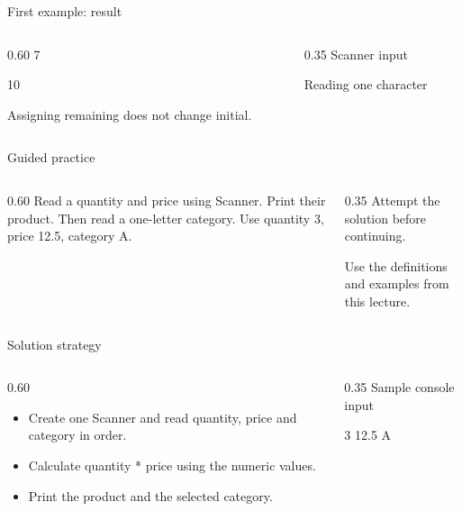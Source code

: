 \documentclass[10pt,aspectratio=169]{beamer}
\begin{document}
\begin{frame}[fragile,t]{First example: result}
\begin{columns}[T,onlytextwidth]\begin{column}{0.60\textwidth}
7\par 10\par Assigning remaining does not change initial.
\end{column}\begin{column}{0.35\textwidth}\small
Scanner input

Reading one character
\end{column}\end{columns}
\end{frame}

\begin{frame}[fragile,t]{Guided practice}
\begin{columns}[T,onlytextwidth]\begin{column}{0.60\textwidth}
Read a quantity and price using Scanner. Print their product. Then read a one-letter category. Use quantity 3, price 12.5, category A.
\end{column}\begin{column}{0.35\textwidth}\small
Attempt the solution before continuing.

Use the definitions and examples from this lecture.
\end{column}\end{columns}
\end{frame}

\begin{frame}[fragile,t]{Solution strategy}
\begin{columns}[T,onlytextwidth]\begin{column}{0.60\textwidth}
\begin{itemize}
\item Create one Scanner and read quantity, price and category in order.
\item Calculate quantity * price using the numeric values.
\item Print the product and the selected category.
\end{itemize}
\end{column}\begin{column}{0.35\textwidth}\small
Sample console input\par 3 12.5 A\par 
\end{column}\end{columns}
\end{frame}
\end{document}
